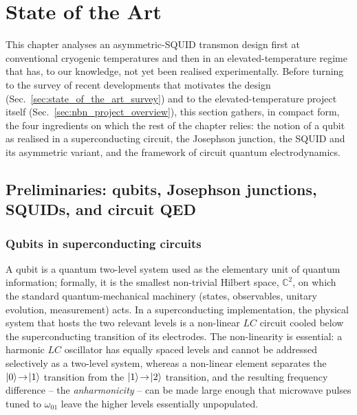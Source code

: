 \section{State of the Art}


\newcommand{\Tc}{T_{\text{c}}}
\newcommand{\Tphys}{T_{\text{phys}}}
\newcommand{\Tnoise}{T_{\text{noise}}}
\newcommand{\nth}{n_{\text{th}}}
\newcommand{\xqp}{x_{\text{qp}}}
\newcommand{\Tone}{T_1}
\newcommand{\Ttwo}{T_2}
\newcommand{\Tphi}{T_\phi}


This chapter analyses an asymmetric-SQUID transmon design first at conventional cryogenic temperatures and then in an elevated-temperature regime that has, to our knowledge, not yet been realised experimentally. Before turning to the survey of recent developments that motivates the design (Sec.~\ref{sec:state_of_the_art_survey}) and to the elevated-temperature project itself (Sec.~\ref{sec:nbn_project_overview}), this section gathers, in compact form, the four ingredients on which the rest of the chapter relies: the notion of a qubit as realised in a superconducting circuit, the Josephson junction, the SQUID and its asymmetric variant, and the framework of circuit quantum electrodynamics.

\subsection{Preliminaries: qubits, Josephson junctions, SQUIDs, and circuit QED}
\label{sec:hw_preliminaries}

\subsubsection*{Qubits in superconducting circuits}

A qubit is a quantum two-level system used as the elementary unit of quantum information; formally, it is the smallest non-trivial Hilbert space, $\mathbb{C}^2$, on which the standard quantum-mechanical machinery (states, observables, unitary evolution, measurement) acts. In a superconducting implementation, the physical system that hosts the two relevant levels is a non-linear $LC$ circuit cooled below the superconducting transition of its electrodes. The non-linearity is essential: a harmonic $LC$ oscillator has equally spaced levels and cannot be addressed selectively as a two-level system, whereas a non-linear element separates the $\ket{0}\!\to\!\ket{1}$ transition from the $\ket{1}\!\to\!\ket{2}$ transition, and the resulting frequency difference -- the \emph{anharmonicity} -- can be made large enough that microwave pulses tuned to $\omega_{01}$ leave the higher levels essentially unpopulated.


